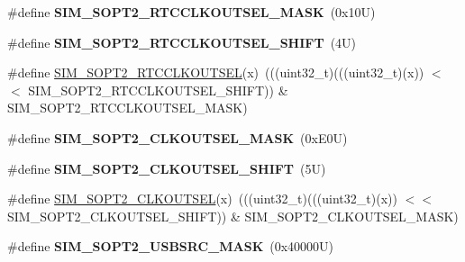 \begin{DoxyCompactItemize}
\item 
\mbox{\label{group___s_i_m___register___masks_ga4ecc21f62a92e94e5f507a6bb5e44062}} 
\#define {\bfseries S\+I\+M\+\_\+\+S\+O\+P\+T2\+\_\+\+R\+T\+C\+C\+L\+K\+O\+U\+T\+S\+E\+L\+\_\+\+M\+A\+SK}~(0x10\+U)
\item 
\mbox{\label{group___s_i_m___register___masks_gaa4b7f7e8f1999ec0d56a1224cf7eb35d}} 
\#define {\bfseries S\+I\+M\+\_\+\+S\+O\+P\+T2\+\_\+\+R\+T\+C\+C\+L\+K\+O\+U\+T\+S\+E\+L\+\_\+\+S\+H\+I\+FT}~(4\+U)
\item 
\#define \mbox{\hyperlink{group___s_i_m___register___masks_gad826a2d088a5cae1628582c992b0349e}{S\+I\+M\+\_\+\+S\+O\+P\+T2\+\_\+\+R\+T\+C\+C\+L\+K\+O\+U\+T\+S\+EL}}(x)~(((uint32\+\_\+t)(((uint32\+\_\+t)(x)) $<$$<$ S\+I\+M\+\_\+\+S\+O\+P\+T2\+\_\+\+R\+T\+C\+C\+L\+K\+O\+U\+T\+S\+E\+L\+\_\+\+S\+H\+I\+FT)) \& S\+I\+M\+\_\+\+S\+O\+P\+T2\+\_\+\+R\+T\+C\+C\+L\+K\+O\+U\+T\+S\+E\+L\+\_\+\+M\+A\+SK)
\item 
\mbox{\label{group___s_i_m___register___masks_ga601bb7007f58e3ad5433d3538f4dcef0}} 
\#define {\bfseries S\+I\+M\+\_\+\+S\+O\+P\+T2\+\_\+\+C\+L\+K\+O\+U\+T\+S\+E\+L\+\_\+\+M\+A\+SK}~(0x\+E0\+U)
\item 
\mbox{\label{group___s_i_m___register___masks_ga520c9a255ff79372237f5f332f749112}} 
\#define {\bfseries S\+I\+M\+\_\+\+S\+O\+P\+T2\+\_\+\+C\+L\+K\+O\+U\+T\+S\+E\+L\+\_\+\+S\+H\+I\+FT}~(5\+U)
\item 
\#define \mbox{\hyperlink{group___s_i_m___register___masks_ga34712f0ffce6dca092bd902ef7eb783f}{S\+I\+M\+\_\+\+S\+O\+P\+T2\+\_\+\+C\+L\+K\+O\+U\+T\+S\+EL}}(x)~(((uint32\+\_\+t)(((uint32\+\_\+t)(x)) $<$$<$ S\+I\+M\+\_\+\+S\+O\+P\+T2\+\_\+\+C\+L\+K\+O\+U\+T\+S\+E\+L\+\_\+\+S\+H\+I\+FT)) \& S\+I\+M\+\_\+\+S\+O\+P\+T2\+\_\+\+C\+L\+K\+O\+U\+T\+S\+E\+L\+\_\+\+M\+A\+SK)
\item 
\mbox{\label{group___s_i_m___register___masks_ga1caf7ffe2555eb59ed410110b6aba463}} 
\#define {\bfseries S\+I\+M\+\_\+\+S\+O\+P\+T2\+\_\+\+U\+S\+B\+S\+R\+C\+\_\+\+M\+A\+SK}~(0x40000\+U)
\item 
\mbox{\label{group___s_i_m___register___masks_ga2a455b7e86f26185c92961e139d13a89}} 

\end{DoxyCompactItemize}
